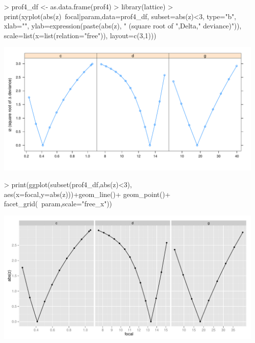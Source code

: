 \documentclass{article}
\begin{document}
\begin{Schunk}
\begin{Sinput}
> prof4_df <- as.data.frame(prof4)
> library(lattice)
> print(xyplot(abs(z)~focal|param,data=prof4_df,
        subset=abs(z)<3,
        type="b",
        xlab="",
        ylab=expression(paste(abs(z),
            " (square root of ",Delta," deviance)")),
        scale=list(x=list(relation="free")),
              layout=c(3,1)))
\end{Sinput}
\end{Schunk}
\includegraphics{mle2-latticeprof}

\begin{Schunk}
\begin{Sinput}
> print(ggplot(subset(prof4_df,abs(z)<3),
        aes(x=focal,y=abs(z)))+geom_line()+
       geom_point()+
       facet_grid(~param,scale="free_x"))
\end{Sinput}
\end{Schunk}
\includegraphics{mle2-ggplotprof}
\end{document}
